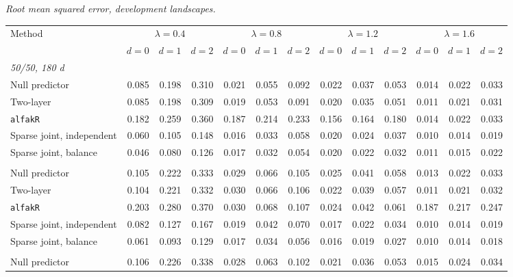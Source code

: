 \noindent\textit{Root mean squared error, development landscapes.}
\begin{center}
\scriptsize
\setlength{\tabcolsep}{2.5pt}
\begin{tabular}{l*{12}{r}}
\toprule
Method & \multicolumn{3}{c}{$\lambda=0.4$} & \multicolumn{3}{c}{$\lambda=0.8$} & \multicolumn{3}{c}{$\lambda=1.2$} & \multicolumn{3}{c}{$\lambda=1.6$} \\
\cmidrule(lr){2-4}\cmidrule(lr){5-7}\cmidrule(lr){8-10}\cmidrule(lr){11-13}
 & $d=0$ & $d=1$ & $d=2$ & $d=0$ & $d=1$ & $d=2$ & $d=0$ & $d=1$ & $d=2$ & $d=0$ & $d=1$ & $d=2$ \\
\midrule
\multicolumn{13}{l}{\textit{50/50, 180 d}} \\
\quad Null predictor & 0.085 & 0.198 & 0.310 & 0.021 & 0.055 & 0.092 & 0.022 & 0.037 & 0.053 & 0.014 & 0.022 & 0.033 \\
\quad Two-layer & 0.085 & 0.198 & 0.309 & 0.019 & 0.053 & 0.091 & 0.020 & 0.035 & 0.051 & 0.011 & 0.021 & 0.031 \\
\quad \texttt{alfakR} & 0.182 & 0.259 & 0.360 & 0.187 & 0.214 & 0.233 & 0.156 & 0.164 & 0.180 & 0.014 & 0.022 & 0.033 \\
\quad Sparse joint, independent & 0.060 & 0.105 & 0.148 & 0.016 & 0.033 & 0.058 & 0.020 & 0.024 & 0.037 & 0.010 & 0.014 & 0.019 \\
\quad Sparse joint, balance & 0.046 & 0.080 & 0.126 & 0.017 & 0.032 & 0.054 & 0.020 & 0.022 & 0.032 & 0.011 & 0.015 & 0.022 \\
\addlinespace[2pt]
\multicolumn{13}{l}{\textit{200/200, 180 d}} \\
\quad Null predictor & 0.105 & 0.222 & 0.333 & 0.029 & 0.066 & 0.105 & 0.025 & 0.041 & 0.058 & 0.013 & 0.022 & 0.033 \\
\quad Two-layer & 0.104 & 0.221 & 0.332 & 0.030 & 0.066 & 0.106 & 0.022 & 0.039 & 0.057 & 0.011 & 0.021 & 0.032 \\
\quad \texttt{alfakR} & 0.203 & 0.280 & 0.370 & 0.030 & 0.068 & 0.107 & 0.024 & 0.042 & 0.061 & 0.187 & 0.217 & 0.247 \\
\quad Sparse joint, independent & 0.082 & 0.127 & 0.167 & 0.019 & 0.042 & 0.070 & 0.017 & 0.022 & 0.034 & 0.010 & 0.014 & 0.019 \\
\quad Sparse joint, balance & 0.061 & 0.093 & 0.129 & 0.017 & 0.034 & 0.056 & 0.016 & 0.019 & 0.027 & 0.010 & 0.014 & 0.018 \\
\addlinespace[2pt]
\multicolumn{13}{l}{\textit{200/200, 360 d}} \\
\quad Null predictor & 0.106 & 0.226 & 0.338 & 0.028 & 0.063 & 0.102 & 0.021 & 0.036 & 0.053 & 0.015 & 0.024 & 0.034 \\

\end{tabular}
\end{center}

